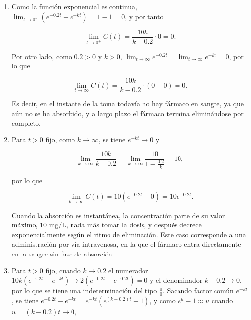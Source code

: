 \documentclass[
  spanish,
  a4paper,
]{scrreport}
\theoremstyle{definition}
\theoremstyle{remark}
\begin{document}
\begin{tcolorbox}[enhanced jigsaw, arc=.35mm, bottomrule=.15mm, bottomtitle=1mm, breakable, colback=white, colbacktitle=quarto-callout-tip-color!10!white, colframe=quarto-callout-tip-color-frame, coltitle=black, left=2mm, leftrule=.75mm, opacityback=0, opacitybacktitle=0.6, rightrule=.15mm, title=\textcolor{quarto-callout-tip-color}{\faLightbulb}\hspace{0.5em}{Solución}, titlerule=0mm, toprule=.15mm, toptitle=1mm]

\begin{enumerate}
\def\labelenumi{\alph{enumi}.}
\item
  Como la función exponencial es continua,
  \(\lim_{t\to 0^+}\left(e^{-0.2t}-e^{-kt}\right) = 1-1 = 0\), y por
  tanto

  \[
  \lim_{t\to 0^+}C(t) = \frac{10k}{k-0.2}\cdot 0 = 0.
  \]

  Por otro lado, como \(0.2>0\) y \(k>0\),
  \(\lim_{t\to\infty}e^{-0.2t} = \lim_{t\to\infty}e^{-kt} = 0\), por lo
  que

  \[
  \lim_{t\to\infty}C(t) = \frac{10k}{k-0.2}\cdot(0-0) = 0.
  \]

  Es decir, en el instante de la toma todavía no hay fármaco en sangre,
  ya que aún no se ha absorbido, y a largo plazo el fármaco termina
  eliminándose por completo.
\item
  Para \(t>0\) fijo, como \(k\to\infty\), se tiene \(e^{-kt}\to 0\) y

  \[
  \lim_{k\to\infty}\frac{10k}{k-0.2} = \lim_{k\to\infty}\frac{10}{1-\frac{0.2}{k}} = 10,
  \]

  por lo que

  \[
  \lim_{k\to\infty}C(t) = 10\left(e^{-0.2t}-0\right) = 10e^{-0.2t}.
  \]

  Cuando la absorción es instantánea, la concentración parte de su valor
  máximo, \(10\) mg/L, nada más tomar la dosis, y después decrece
  exponencialmente según el ritmo de eliminación. Este caso corresponde
  a una administración por vía intravenosa, en la que el fármaco entra
  directamente en la sangre sin fase de absorción.
\item
  Para \(t>0\) fijo, cuando \(k\to 0.2\) el numerador
  \(10k\left(e^{-0.2t}-e^{-kt}\right)\to 2(e^{-0.2t}-e^{-0.2t}) = 0\) y
  el denominador \(k-0.2\to 0\), por lo que se tiene una indeterminación
  del tipo \(\frac{0}{0}\). Sacando factor común \(e^{-kt}\), se tiene
  \(e^{-0.2t}-e^{-kt} = e^{-kt}\left(e^{(k-0.2)t}-1\right)\), y como
  \(e^{u}-1\approx u\) cuando \(u = (k-0.2)t\to 0\),


\end{enumerate}
\end{tcolorbox}
\end{document}
